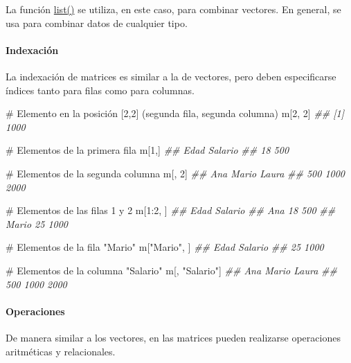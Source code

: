 \documentclass[
  letterpaper,
  DIV=11,
  numbers=noendperiod]{scrreprt}
\let\oldparagraph\paragraph
\renewcommand{\paragraph}[1]{\oldparagraph{#1}\mbox{}}
\newenvironment{Shaded}{\begin{snugshade}}{\end{snugshade}}
\newcommand{\CommentTok}[1]{\textcolor[rgb]{0.37,0.37,0.37}{#1}}
\newcommand{\DecValTok}[1]{\textcolor[rgb]{0.68,0.00,0.00}{#1}}
\newcommand{\DocumentationTok}[1]{\textcolor[rgb]{0.37,0.37,0.37}{\textit{#1}}}
\newcommand{\NormalTok}[1]{\textcolor[rgb]{0.00,0.23,0.31}{#1}}
\newcommand{\SpecialCharTok}[1]{\textcolor[rgb]{0.37,0.37,0.37}{#1}}
\newcommand{\StringTok}[1]{\textcolor[rgb]{0.13,0.47,0.30}{#1}}
\begin{document}
La función \href{https://rdrr.io/r/base/list.html}{list()} se utiliza,
en este caso, para combinar vectores. En general, se usa para combinar
datos de cualquier tipo.

\hypertarget{indexaciuxf3n-1}{%
\paragraph{Indexación}\label{indexaciuxf3n-1}}

La indexación de matrices es similar a la de vectores, pero deben
especificarse índices tanto para filas como para columnas.

\begin{Shaded}
\begin{Highlighting}[]
\CommentTok{\# Elemento en la posición [2,2] (segunda fila, segunda columna)}
\NormalTok{m[}\DecValTok{2}\NormalTok{, }\DecValTok{2}\NormalTok{]}
\DocumentationTok{\#\# [1] 1000}

\CommentTok{\# Elementos de la primera fila}
\NormalTok{m[}\DecValTok{1}\NormalTok{,]}
\DocumentationTok{\#\#    Edad Salario }
\DocumentationTok{\#\#      18     500}

\CommentTok{\# Elementos de la segunda columna}
\NormalTok{m[, }\DecValTok{2}\NormalTok{]}
\DocumentationTok{\#\#   Ana Mario Laura }
\DocumentationTok{\#\#   500  1000  2000}

\CommentTok{\# Elementos de las filas 1 y 2}
\NormalTok{m[}\DecValTok{1}\SpecialCharTok{:}\DecValTok{2}\NormalTok{, ]}
\DocumentationTok{\#\#       Edad Salario}
\DocumentationTok{\#\# Ana     18     500}
\DocumentationTok{\#\# Mario   25    1000}

\CommentTok{\# Elementos de la fila "Mario"}
\NormalTok{m[}\StringTok{"Mario"}\NormalTok{, ]}
\DocumentationTok{\#\#    Edad Salario }
\DocumentationTok{\#\#      25    1000}

\CommentTok{\# Elementos de la columna "Salario"}
\NormalTok{m[, }\StringTok{"Salario"}\NormalTok{]}
\DocumentationTok{\#\#   Ana Mario Laura }
\DocumentationTok{\#\#   500  1000  2000}
\end{Highlighting}
\end{Shaded}

\hypertarget{operaciones-1}{%
\paragraph{Operaciones}\label{operaciones-1}}

De manera similar a los vectores, en las matrices pueden realizarse
operaciones aritméticas y relacionales.
\end{document}
